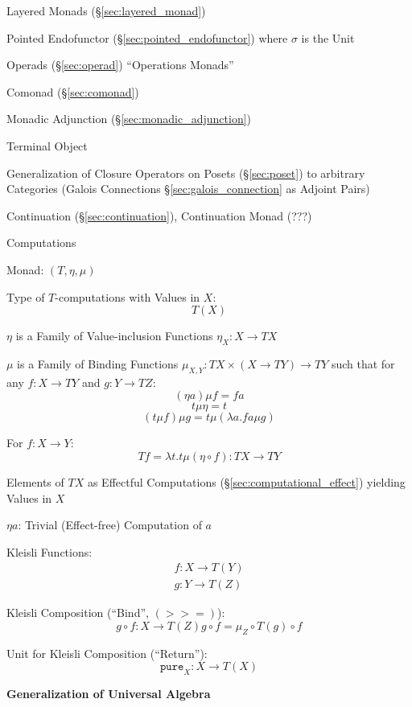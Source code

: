 Layered Monads (\S\ref{sec:layered_monad}) \cite{filinski99}

Pointed Endofunctor (\S\ref{sec:pointed_endofunctor}) where $\sigma$
is the Unit

Operads (\S\ref{sec:operad}) ``Operations Monads''


\asterism


Comonad (\S\ref{sec:comonad})

Monadic Adjunction (\S\ref{sec:monadic_adjunction})

Terminal Object %

Generalization of Closure Operators on Posets (\S\ref{sec:poset}) to
arbitrary Categories (Galois Connections \S\ref{sec:galois_connection}
as Adjoint Pairs)

Continuation (\S\ref{sec:continuation}), Continuation Monad (???) %


\asterism


Computations

Monad: $(T,\eta,\mu)$

Type of $T$-computations with Values in $X$:
\[
  T (X)
\]

$\eta$ is a Family of Value-inclusion Functions $\eta_X : X
\rightarrow T X$

$\mu$ is a Family of Binding Functions $\mu_{X,Y} : T X \times (X
\rightarrow T Y) \rightarrow T Y$ such that for any $f : X \rightarrow
T Y$ and $g : Y \rightarrow T Z$:
\[
 (\eta a) \mu f = f a
\]\[
  t \mu \eta = t
\]\[
  (t \mu f) \mu g = t \mu (\lambda a.f a \mu g)
\]

For $f : X \rightarrow Y$:
\[
  T f = \lambda t.t \mu (\eta \circ f) : T X \rightarrow T Y
\]

Elements of $T X$ as Effectful Computations
(\S\ref{sec:computational_effect}) yielding Values in $X$

$\eta a$: Trivial (Effect-free) Computation of $a$


Kleisli Functions:
\[
\begin{split}
  f : X \rightarrow T(Y) \\
  g : Y \rightarrow T(Z)
\end{split}
\]

Kleisli Composition (``Bind'', $\mathtt{(>>=)}$):
\[
  g \circ f : X \rightarrow T(Z)
  g \circ f = \mu_Z \circ T(g) \circ f
\]

Unit for Kleisli Composition (``Return''):
\[
  \mathtt{pure}_X : X \rightarrow T (X)
\]


\textbf{Generalization of Universal Algebra}

